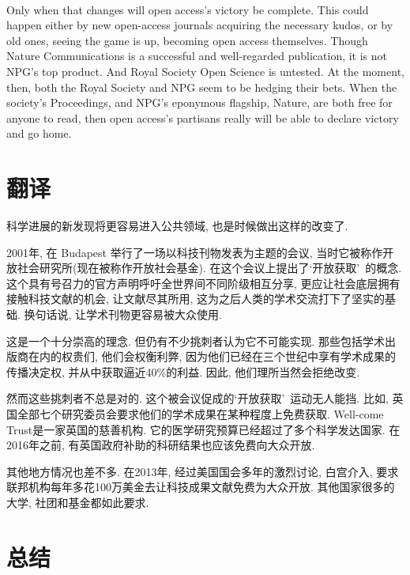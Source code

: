 \documentclass[a4paper, 12pt, UTF8]{article}
\begin{document}
\paragraph*{}
    Only when that changes will open access’s victory be complete. This could happen either by new open-access journals acquiring the necessary kudos, or by old ones, seeing the game is up, becoming open access themselves. Though Nature Communications is a successful and well-regarded publication, it is not NPG’s top product. And Royal Society Open Science is untested. At the moment, then, both the Royal Society and NPG seem to be hedging their bets. When the society’s Proceedings, and NPG’s eponymous flagship, Nature, are both free for anyone to read, then open access’s partisans really will be able to declare victory and go home.

\section{翻译}
科学进展的新发现将更容易进入公共领域, 也是时候做出这样的改变了.

2001年, 在 Budapest 举行了一场以科技刊物发表为主题的会议, 当时它被称作开放社会研究所(现在被称作开放社会基金). 在这个会议上提出了\lq 开放获取\rq\ 的概念. 这个具有号召力的官方声明呼吁全世界间不同阶级相互分享, 更应让社会底层拥有接触科技文献的机会, 让文献尽其所用, 这为之后人类的学术交流打下了坚实的基础. 换句话说, 让学术刊物更容易被大众使用.

这是一个十分崇高的理念. 但仍有不少挑刺者认为它不可能实现. 那些包括学术出版商在内的权贵们, 他们会权衡利弊, 因为他们已经在三个世纪中享有学术成果的传播决定权, 并从中获取逼近40\%的利益. 因此, 他们理所当然会拒绝改变.

然而这些挑刺者不总是对的. 这个被会议促成的\lq 开放获取\rq\ 运动无人能挡. 比如, 英国全部七个研究委员会要求他们的学术成果在某种程度上免费获取. Well-come Trust是一家英国的慈善机构. 它的医学研究预算已经超过了多个科学发达国家. 在2016年之前, 有英国政府补助的科研结果也应该免费向大众开放.

其他地方情况也差不多. 在2013年, 经过美国国会多年的激烈讨论, 白宫介入, 要求联邦机构每年多花100万美金去让科技成果文献免费为大众开放. 其他国家很多的大学, 社团和基金都如此要求.


\section{总结}
\end{document}
